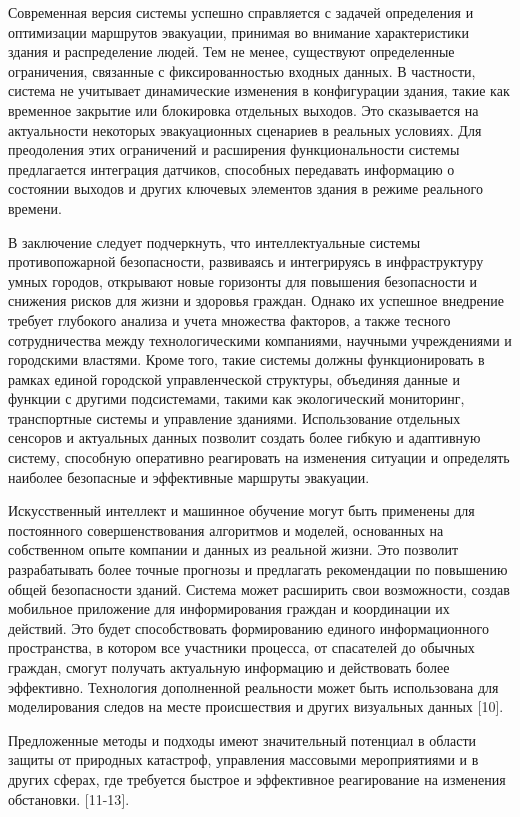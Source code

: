Современная версия системы успешно справляется с задачей определения и
оптимизации маршрутов эвакуации, принимая во внимание характеристики
здания и распределение людей. Тем не менее, существуют определенные
ограничения, связанные с фиксированностью входных данных. В частности,
система не учитывает динамические изменения в конфигурации здания, такие
как временное закрытие или блокировка отдельных выходов. Это сказывается
на актуальности некоторых эвакуационных сценариев в реальных условиях.
Для преодоления этих ограничений и расширения функциональности системы
предлагается интеграция датчиков, способных передавать информацию о
состоянии выходов и других ключевых элементов здания в режиме реального
времени.

В заключение следует подчеркнуть, что интеллектуальные системы
противопожарной безопасности, развиваясь и интегрируясь в инфраструктуру
умных городов, открывают новые горизонты для повышения безопасности и
снижения рисков для жизни и здоровья граждан. Однако их успешное
внедрение требует глубокого анализа и учета множества факторов, а также
тесного сотрудничества между технологическими компаниями, научными
учреждениями и городскими властями. Кроме того, такие системы должны
функционировать в рамках единой городской управленческой структуры,
объединяя данные и функции с другими подсистемами, такими как
экологический мониторинг, транспортные системы и управление зданиями.
Использование отдельных сенсоров и актуальных данных позволит создать
более гибкую и адаптивную систему, способную оперативно реагировать на
изменения ситуации и определять наиболее безопасные и эффективные
маршруты эвакуации.

Искусственный интеллект и машинное обучение могут быть применены для
постоянного совершенствования алгоритмов и моделей, основанных на
собственном опыте компании и данных из реальной жизни. Это позволит
разрабатывать более точные прогнозы и предлагать рекомендации по
повышению общей безопасности зданий. Система может расширить свои
возможности, создав мобильное приложение для информирования граждан и
координации их действий. Это будет способствовать формированию единого
информационного пространства, в котором все участники процесса, от
спасателей до обычных граждан, смогут получать актуальную информацию и
действовать более эффективно. Технология дополненной реальности может
быть использована для моделирования следов на месте происшествия и
других визуальных данных {[}10{]}.

Предложенные методы и подходы имеют значительный потенциал в области
защиты от природных катастроф, управления массовыми мероприятиями и в
других сферах, где требуется быстрое и эффективное реагирование на
изменения обстановки. {[}11-13{]}.

